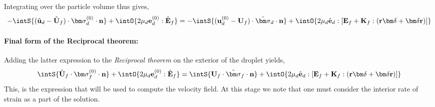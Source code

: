 Integrating over the particle volume thus gives, 
\begin{equation*}
    - \intS{
         (\hat{\textbf{u}}_d - \hat{\textbf{U}}_f) \cdot \bm\sigma_d^{(0)}  \cdot \textbf{n}
    }
    + \intO{2\mu_d \textbf{e}_d^{(0)} : \hat{\textbf{E}}_f}
    = 
    - \intS{
     (\textbf{u}_d^{(0)} - \textbf{U}_f)\cdot \hat{\bm\sigma}_d \cdot \textbf{n}
    }
    +\intO{ 2\mu_d \hat{\textbf{e}}_d : [ \textbf{E}_f + \textbf{K}_f : (\textbf{r} \bm\delta + \bm\delta \textbf{r})] }
\end{equation*}

\paragraph*{Final form of the Reciprocal theorem: }
Adding the latter expression to the \textit{Reciprocal theorem} on the exterior of the droplet yields, 
\begin{equation*}
    \intS{\hat{\textbf{U}}_f\cdot  \bm\sigma_f^{(0)} \cdot \textbf{n}}
    + \intO{2\mu_d \textbf{e}_d^{(0)} : \hat{\textbf{E}}_f}
    = 
    \intS{\textbf{U}_f\cdot  \hat{\bm\sigma}_f \cdot \textbf{n}}
    +\intO{ 2\mu_d \hat{\textbf{e}}_d : [ \textbf{E}_f + \textbf{K}_f : (\textbf{r} \bm\delta + \bm\delta \textbf{r})] }
\end{equation*}
This, is the expression that will be used to compute the velocity field. 
At this stage we note that one must consider the interior rate of strain as a part of the solution. 

